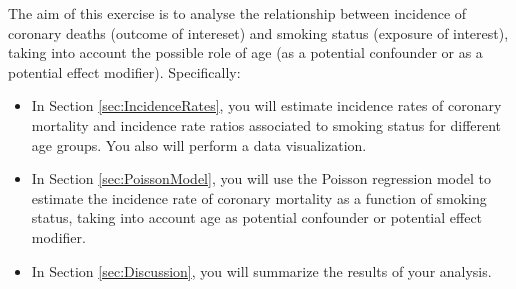 \documentclass[10pt,a4paper,twoside]{article}\usepackage[]{graphicx}\usepackage[]{xcolor}
\begin{document}
The aim of this exercise is to analyse the relationship between incidence of coronary deaths (outcome of intereset) and smoking status (exposure of interest), taking into account the possible role of age (as a potential confounder or as a potential effect modifier). Specifically:
\begin{itemize}
\item In Section \ref{sec:IncidenceRates}, you will estimate incidence rates of coronary mortality and incidence rate ratios associated to smoking status for different age groups. You also will perform a data visualization.
\item In Section \ref{sec:PoissonModel}, you will use the Poisson regression model to estimate the incidence rate of coronary mortality as a function of smoking status, taking into account age as potential confounder or potential effect modifier.
\item In Section \ref{sec:Discussion}, you will summarize the results of your analysis.
\end{itemize}
\end{document}
